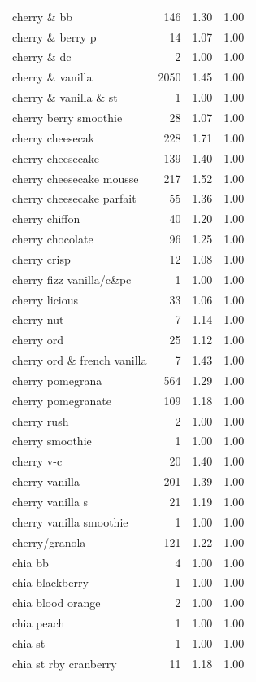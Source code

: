 \begin{table}
\begin{tabular}{lrrr}
cherry \& bb & 146 & 1.30 & 1.00 \\
cherry \& berry p & 14 & 1.07 & 1.00 \\
cherry \& dc & 2 & 1.00 & 1.00 \\
cherry \& vanilla & 2050 & 1.45 & 1.00 \\
cherry \& vanilla \& st & 1 & 1.00 & 1.00 \\
cherry berry smoothie & 28 & 1.07 & 1.00 \\
cherry cheesecak & 228 & 1.71 & 1.00 \\
cherry cheesecake & 139 & 1.40 & 1.00 \\
cherry cheesecake mousse & 217 & 1.52 & 1.00 \\
cherry cheesecake parfait & 55 & 1.36 & 1.00 \\
cherry chiffon & 40 & 1.20 & 1.00 \\
cherry chocolate & 96 & 1.25 & 1.00 \\
cherry crisp & 12 & 1.08 & 1.00 \\
cherry fizz vanilla/c\&pc & 1 & 1.00 & 1.00 \\
cherry licious & 33 & 1.06 & 1.00 \\
cherry nut & 7 & 1.14 & 1.00 \\
cherry ord & 25 & 1.12 & 1.00 \\
cherry ord \& french vanilla & 7 & 1.43 & 1.00 \\
cherry pomegrana & 564 & 1.29 & 1.00 \\
cherry pomegranate & 109 & 1.18 & 1.00 \\
cherry rush & 2 & 1.00 & 1.00 \\
cherry smoothie & 1 & 1.00 & 1.00 \\
cherry v-c & 20 & 1.40 & 1.00 \\
cherry vanilla & 201 & 1.39 & 1.00 \\
cherry vanilla s & 21 & 1.19 & 1.00 \\
cherry vanilla smoothie & 1 & 1.00 & 1.00 \\
cherry/granola & 121 & 1.22 & 1.00 \\
chia bb & 4 & 1.00 & 1.00 \\
chia blackberry & 1 & 1.00 & 1.00 \\
chia blood orange & 2 & 1.00 & 1.00 \\
chia peach & 1 & 1.00 & 1.00 \\
chia st & 1 & 1.00 & 1.00 \\
chia st rby cranberry & 11 & 1.18 & 1.00 \\

\end{tabular}
\end{table}
